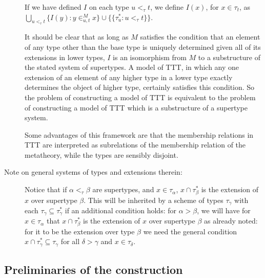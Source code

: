\documentclass[112pt]{article}
\begin{document}
\begin{description}
If we have defined $I$ on each type $u <_\tau t$, we define $I(x)$, for $x \in \tau_t$, as
$\bigcup_{u <_\tau t} \{I(y):y \in^M_{u,t} x\} \cup \{\{\tau^*_u:u <_\tau t\}\}$.

It should be clear that as long as $M$ satisfies the condition that an element of any type other than the base type is uniquely determined given all of its extensions in lower types, $I$ is an isomorphism from $M$ to a substructure of the stated system of supertypes.  A model of TTT, in which any one extension of an element of any higher type in a lower type exactly determines the object of higher type, certainly satisfies this condition.  So the problem of constructing a model of TTT is equivalent to the problem of constructing a model of TTT which is a substructure of a supertype system.

Some advantages of this framework are that the membership relations in TTT are interpreted as subrelations of the membership relation of the metatheory, while the types are sensibly disjoint.

\item[Note on general systems of types and extensions therein:]  Notice that if $\alpha<_\tau \beta$ are supertypes, and $x \in \tau_\alpha$, $x \cap \tau^*_\beta$ is the extension of $x$ over supertype $\beta$.  This will be inherited by a scheme of types $\tau_\gamma$ with each $\tau_\gamma \subseteq \tau^*_\gamma$ if an additional condition holds:  for $\alpha>\beta$, we will have
for $x \in \tau_\alpha$ that $x \cap \tau^*_\beta$ is the extension of $x$ over supertype $\beta$ as already noted:  for it to be the extension over type $\beta$ we need the general condition $x \cap \tau^*_\gamma \subseteq \tau_\gamma$ for all $\delta>\gamma$ and $x \in \tau_\delta$.


\end{description}

\subsection{Preliminaries of the construction}
\end{document}
